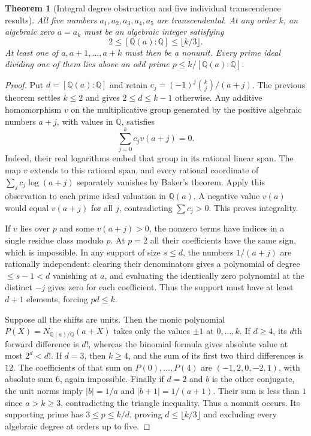 \documentclass[11pt,a4paper]{article}
\newtheorem{theorem}{Theorem}[section]
\theoremstyle{definition}\newtheorem{definition}[theorem]{Definition}\newtheorem{example}[theorem]{Example}
\theoremstyle{remark}\newtheorem{remark}[theorem]{Remark}
\newcommand{\Q}{\mathbb Q}\newcommand{\Z}{\mathbb Z}\newcommand{\R}{\mathbb R}\newcommand{\N}{\mathbb N}
\begin{document}
\begin{theorem}[Integral degree obstruction and five individual transcendence results]\label{thm:five-zeros}
All five numbers $a_1,a_2,a_3,a_4,a_5$ are transcendental. At any order $k$, an algebraic zero $a=a_k$ must be an algebraic integer satisfying
\[
 2\le [\Q(a):\Q]\le\lfloor k/3\rfloor.
\]
At least one of $a,a+1,\ldots,a+k$ must then be a nonunit. Every prime ideal dividing one of them lies above an odd prime $p\le k/[\Q(a):\Q]$.
\end{theorem}
\begin{proof}
Put $d=[\Q(a):\Q]$ and retain $c_j=(-1)^j\binom{k}{j}/(a+j)$. The previous theorem settles $k\le2$ and gives $2\le d\le k-1$ otherwise. Any additive homomorphism $v$ on the multiplicative group generated by the positive algebraic numbers $a+j$, with values in $\Q$, satisfies
\[
 \sum_{j=0}^k c_j v(a+j)=0.
\]
Indeed, their real logarithms embed that group in its rational linear span. The map $v$ extends to this rational span, and every rational coordinate of $\sum_j c_j\log(a+j)$ separately vanishes by Baker's theorem. Apply this observation to each prime ideal valuation in $\Q(a)$. A negative value $v(a)$ would equal $v(a+j)$ for all $j$, contradicting $\sum c_j>0$. This proves integrality.

If $v$ lies over $p$ and some $v(a+j)>0$, the nonzero terms have indices in a single residue class modulo $p$. At $p=2$ all their coefficients have the same sign, which is impossible. In any support of size $s\le d$, the numbers $1/(a+j)$ are rationally independent: clearing their denominators gives a polynomial of degree $\le s-1<d$ vanishing at $a$, and evaluating the identically zero polynomial at the distinct $-j$ gives zero for each coefficient. Thus the support must have at least $d+1$ elements, forcing $p d\le k$.

Suppose all the shifts are units. Then the monic polynomial $P(X)=N_{\Q(a)/\Q}(a+X)$ takes only the values $\pm1$ at $0,\ldots,k$. If $d\ge4$, its $d$th forward difference is $d!$, whereas the binomial formula gives absolute value at most $2^d<d!$. If $d=3$, then $k\ge4$, and the sum of its first two third differences is $12$. The coefficients of that sum on $P(0),\ldots,P(4)$ are $(-1,2,0,-2,1)$, with absolute sum $6$, again impossible. Finally if $d=2$ and $b$ is the other conjugate, the unit norms imply $|b|=1/a$ and $|b+1|=1/(a+1)$. Their sum is less than $1$ since $a>k\ge3$, contradicting the triangle inequality. Thus a nonunit occurs. Its supporting prime has $3\le p\le k/d$, proving $d\le\lfloor k/3\rfloor$ and excluding every algebraic degree at orders up to five.
\end{proof}
\end{document}

